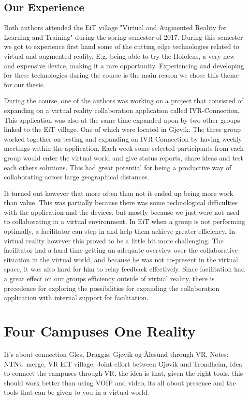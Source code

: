         \subsection{Our Experience}
        Both authors attended the EiT village "Virtual and Augmented Reality for Learning and Training" during the spring semester of 2017. During this semester we got to experience first hand some of the cutting edge technologies related to virtual and augmented reality. E.g. being able to try the Hololens, a very new and expensive device, making it a rare opportunity. Experiencing and developing for these technologies during the course is the main reason we chose this theme for our thesis.
        
        During the course, one of the authors was working on a project that consisted of expanding on a virtual reality collaboration application called IVR-Connection. This application was also at the same time expanded upon by two other groups linked to the EiT village. One of which were located in Gjøvik. The three group worked together on testing and expanding on IVR-Connection by having weekly meetings within the application. Each week some selected participants from each group would enter the virtual world and give status reports, share ideas and test each others solutions. This had great potential for being a productive way of collaborating across large geographical distances.
        
        It turned out however that more often than not it ended up being more work than value. This was partially because there was some technological difficulties with the application and the devices, but mostly because we just were not used to collaborating in a virtual environment. In EiT when a group is not performing optimally, a facilitator can step in and help them achieve greater efficiency. In virtual reality however this proved to be a little bit more challenging. The facilitator had a hard time getting an adequate overview over the collaborative situation in the virtual world, and because he was not co-present in the virtual space, it was also hard for him to relay feedback effectively. Since facilitation had a great effect on our groups efficiency outside of virtual reality, there is precedence for exploring the possibilities for expanding the collaboration application with internal support for facilitation.
        
    \section{Four Campuses One Reality}
    It's about connection Gløs, Draggis, Gjøvik og Ålesund through VR.
    Notes: NTNU merge, VR EiT village, Joint effort between Gjøvik and Trondheim, Idea to connect the campuses through VR, the idea is that, given the right tools, this should work better than using VOIP and video, its all about presence and the tools that can be given to you in a virtual world. \cite{4C1R}
    
